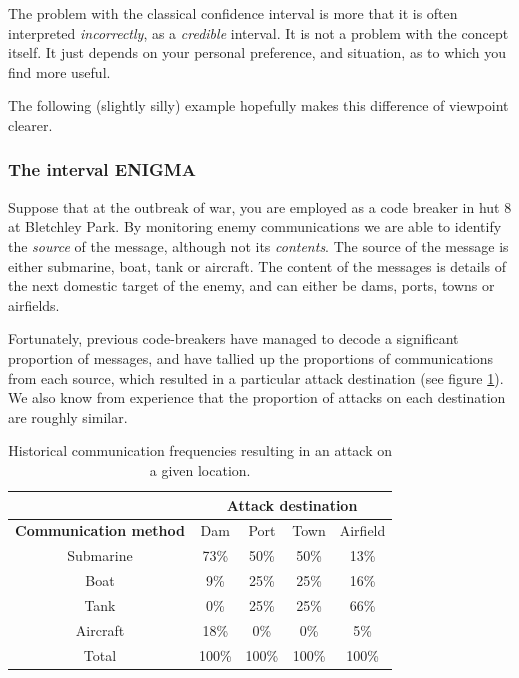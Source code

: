 \documentclass[11pt,fullpage]{book}
\begin{document}
The problem with the classical confidence interval is more that it is often interpreted \textit{incorrectly}, as a \textit{credible} interval. It is not a problem with the concept itself. It just depends on your personal preference, and situation, as to which you find more useful.

The following (slightly silly) example hopefully makes this difference of viewpoint clearer. 

\subsubsection{The interval ENIGMA}
Suppose that at the outbreak of war, you are employed as a code breaker in hut 8 at Bletchley Park. By monitoring enemy communications we are able to identify the \textit{source} of the message, although not its \textit{contents}. The source of the message is either submarine, boat, tank or aircraft. The content of the messages is details of the next domestic target of the enemy, and can either be dams, ports, towns or airfields.

Fortunately, previous code-breakers have managed to decode a significant proportion of messages, and have tallied up the proportions of communications from each source, which resulted in a particular attack destination (see figure \ref{tab:Posterior_confidenceIntervalHistoric}). We also know from experience that the proportion of attacks on each destination are roughly similar.


\begin{table}[htbp]
  \centering
    \begin{tabular}{ccccc}
    \toprule
          & \multicolumn{4}{c}{\textbf{Attack destination}} \\
    \midrule
    \textbf{Communication method} & Dam & Port & Town & Airfield \\
    Submarine & 73\%  & 50\%  & 50\%  & 13\% \\
    Boat  & 9\%   & 25\%  & 25\%  & 16\% \\
    Tank  & 0\%   & 25\%  & 25\%  & 66\% \\
    Aircraft & 18\%   & 0\%  & 0\%   & 5\% \\
    \bottomrule
    Total & 100\% & 100\% & 100\% & 100\% \\
    \end{tabular}%
  \caption{Historical communication frequencies resulting in an attack on a given location.}\label{tab:Posterior_confidenceIntervalHistoric}
\end{table}%
\end{document}
